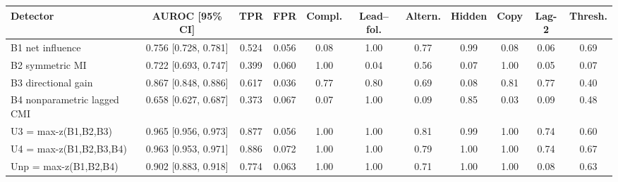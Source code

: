\begin{tabular}{lcccccccccc}
\toprule
Detector & AUROC [95\% CI] & TPR & FPR & Compl. & Lead--fol. & Altern. & Hidden & Copy & Lag-2 & Thresh. \\
\midrule
B1 net influence & 0.756 [0.728, 0.781] & 0.524 & 0.056 & 0.08 & 1.00 & 0.77 & 0.99 & 0.08 & 0.06 & 0.69 \\
B2 symmetric MI & 0.722 [0.693, 0.747] & 0.399 & 0.060 & 1.00 & 0.04 & 0.56 & 0.07 & 1.00 & 0.05 & 0.07 \\
B3 directional gain & 0.867 [0.848, 0.886] & 0.617 & 0.036 & 0.77 & 0.80 & 0.69 & 0.08 & 0.81 & 0.77 & 0.40 \\
B4 nonparametric lagged CMI & 0.658 [0.627, 0.687] & 0.373 & 0.067 & 0.07 & 1.00 & 0.09 & 0.85 & 0.03 & 0.09 & 0.48 \\
\midrule
U3 = max-z(B1,B2,B3) & 0.965 [0.956, 0.973] & 0.877 & 0.056 & 1.00 & 1.00 & 0.81 & 0.99 & 1.00 & 0.74 & 0.60 \\
U4 = max-z(B1,B2,B3,B4) & 0.963 [0.953, 0.971] & 0.886 & 0.072 & 1.00 & 1.00 & 0.79 & 1.00 & 1.00 & 0.74 & 0.67 \\
Unp = max-z(B1,B2,B4) & 0.902 [0.883, 0.918] & 0.774 & 0.063 & 1.00 & 1.00 & 0.71 & 1.00 & 1.00 & 0.08 & 0.63 \\
\bottomrule
\end{tabular}